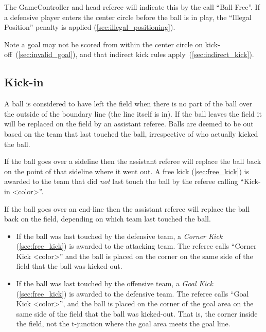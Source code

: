 The GameController and head referee will indicate this by the call ``Ball Free''.
If a defensive player enters the center circle before the ball is in play, the ``Illegal Position'' penalty is applied (\cf \cref{sec:illegal_positioning}).

Note a goal may not be scored from within the center circle on kick-off~(\cf \cref{sec:invalid_goal}), and that indirect kick rules apply~(\cf \cref{sec:indirect_kick}).

\subsection{Kick-in}
\label{sec:kick_in}

A ball is considered to have left the field when there is no part of the ball over the outside of the boundary line (\ie the line itself is in). If the ball leaves the field it will be replaced on the field by an assistant referee. Balls are deemed to be out based on the team that last touched the ball, irrespective of who actually kicked the ball.

If the ball goes over a sideline then the assistant referee will replace the ball back on the point of that sideline where it went out. A free kick (\cf \cref{sec:free_kick}) is awarded to the team that did \emph{not} last touch the ball by the referee calling ``Kick-in \textless color\textgreater''.

If the ball goes over an end-line then the assistant referee will replace the ball back on the field, depending on which team last touched the ball.

\begin{itemize}
  \item If the ball was last touched by the defensive team, a \emph{Corner Kick} (\cf \cref{sec:free_kick}) is awarded to the attacking team. The referee calls ``Corner Kick \textless color\textgreater'' and the ball is placed on the corner on the same side of the field that the ball was kicked-out.
  \item If the ball was last touched by the offensive team, a \emph{Goal Kick} (\cf \cref{sec:free_kick}) is awarded to the defensive team. The referee calls ``Goal Kick \textless color\textgreater'', and the ball is placed on the corner of the goal area on the same side of the field that the ball was kicked-out. That is, the corner inside the field, not the t-junction where the goal area meets the goal line.
\end{itemize}

